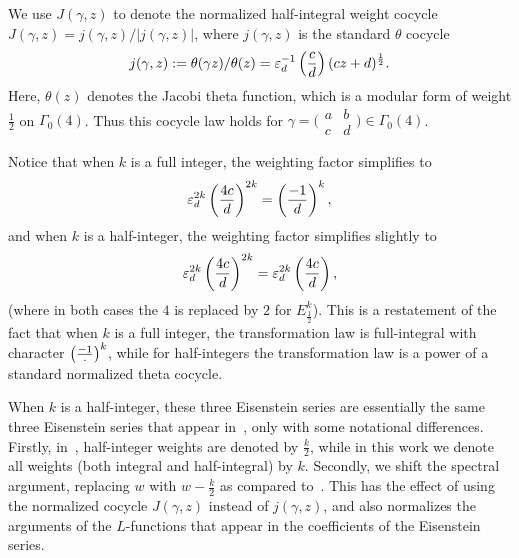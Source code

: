 We use $J(\gamma, z)$ to denote the normalized half-integral weight cocycle
$J(\gamma, z) = j(\gamma, z)/\lvert j(\gamma, z) \rvert$,
where $j(\gamma, z)$ is the standard $\theta$ cocycle
\begin{equation}
  j(\gamma, z) :=
  \theta(\gamma z)/\theta(z) = \varepsilon_d^{-1} \left(\frac{c}{d}\right) (cz + d)^{\frac{1}{2}}.
\end{equation}
Here, $\theta(z)$ denotes the Jacobi theta function,
which is a modular form of weight $\frac{1}{2}$ on $\Gamma_0(4)$.
Thus this cocycle law holds for $\gamma = \big( \begin{smallmatrix} a&b\\c&d
\end{smallmatrix} \big) \in \Gamma_0(4)$.



Notice that when $k$ is a full integer, the weighting factor simplifies to
\begin{equation}
  \varepsilon_d^{2k} \left(\frac{4c}{d}\right)^{2k} = \left(\frac{-1}{d}\right)^k,
\end{equation}
and when $k$ is a half-integer, the weighting factor simplifies slightly to
\begin{equation}
  \varepsilon_d^{2k} \left(\frac{4c}{d}\right)^{2k} = \varepsilon_d^{2k} \left(\frac{4c}{d}\right),
\end{equation}
(where in both cases the $4$ is replaced by $2$ for $E_\frac{1}{2}^k$).
This is a restatement of the fact that when $k$ is a full integer, the transformation law
is full-integral with character $\left(\frac{-1}{\cdot}\right)^k$, while for half-integers the
transformation law is a power of a standard normalized theta cocycle.


When $k$ is a half-integer, these three Eisenstein series are essentially the same three
Eisenstein series that appear in~\cite{goldfeld1985eisenstein}, only with some notational
differences.
Firstly, in~\cite{goldfeld1985eisenstein}, half-integer weights are denoted by
$\frac{k}{2}$, while in this work we denote all weights (both integral and half-integral)
by $k$.
Secondly, we shift the spectral argument, replacing $w$ with $w - \frac{k}{2}$ as compared
to~\cite{goldfeld1985eisenstein}.
This has the effect of using the normalized cocycle $J(\gamma,z)$ instead of
$j(\gamma,z)$, and also normalizes the arguments of the $L$-functions that appear in the
coefficients of the Eisenstein series.


